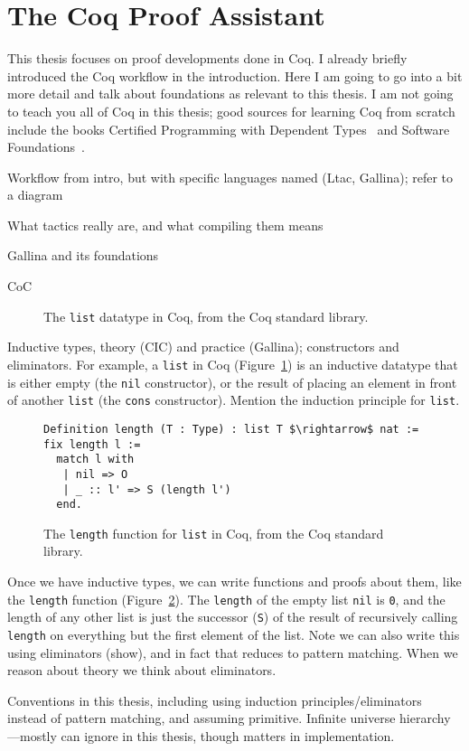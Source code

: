 \section{The Coq Proof Assistant}
\label{sec:mot-coq}

This thesis focuses on proof developments done in Coq.
I already briefly introduced the Coq workflow in the introduction.
Here I am going to go into a bit more detail and talk about foundations as relevant to this thesis.
I am not going to teach you all of Coq in this thesis;
good sources for learning Coq from scratch include the books Certified Programming with Dependent Types~\cite{chlipala:cpdt}
and Software Foundations~\cite{software-foundations}.

Workflow from intro, but with specific languages named (Ltac, Gallina); refer to a diagram

What tactics really are, and what compiling them means

Gallina and its foundations

CoC

\begin{figure}
   
\caption{The \lstinline{list} datatype in Coq, from the Coq standard library.}
\label{fig:list}
\end{figure}

Inductive types, theory (CIC) and practice (Gallina); constructors and eliminators.
For example, a \lstinline{list} in Coq (Figure~\ref{fig:list}) is an inductive datatype that is 
either empty (the \lstinline{nil} constructor), or the result
of placing an element in front of another \lstinline{list} (the \lstinline{cons} constructor).
Mention the induction principle for \lstinline{list}.

\begin{figure}
\begin{lstlisting}
Definition length (T : Type) : list T $\rightarrow$ nat := fix length l :=
  match l with
   | nil => O
   | _ :: l' => S (length l')
  end.
\end{lstlisting}
\caption{The \lstinline{length} function for \lstinline{list} in Coq, from the Coq standard library.}
\label{fig:length}
\end{figure}

Once we have inductive types, we can write functions and proofs about them, like the \lstinline{length} function (Figure~\ref{fig:length}).
The \lstinline{length} of the empty list \lstinline{nil} is \lstinline{0}, and the length of any other list
is just the successor (\lstinline{S}) of the result of recursively calling \lstinline{length} on everything but the first element of the list.
Note we can also write this using eliminators (show), and in fact that reduces to pattern matching.
When we reason about theory we think about eliminators.

Conventions in this thesis, including using induction principles/eliminators instead of pattern matching, and assuming primitive.
Infinite universe hierarchy---mostly can ignore in this thesis, though matters in implementation.
